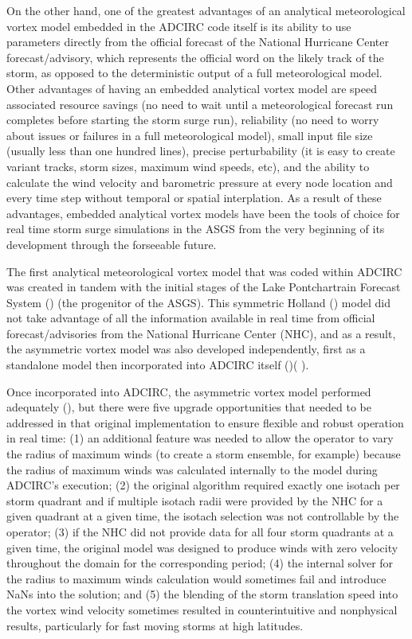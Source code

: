 \documentclass[12pt]{article}
\begin{document}
On the other hand, one of the greatest advantages of an analytical 
meteorological vortex model embedded in the ADCIRC code itself is 
its ability to use parameters directly from the official forecast of 
the National Hurricane Center forecast/advisory, which represents 
the official word on the likely track of the storm, as opposed to 
the deterministic output of a full meteorological model. Other 
advantages of having an embedded analytical vortex model are speed 
associated resource savings (no need to wait until a meteorological 
forecast run completes before starting the storm surge run), 
reliability (no need to worry about issues or failures in a full 
meteorological model), small input file size (usually less than one 
hundred lines), precise perturbability (it is easy to create variant 
tracks, storm sizes, maximum wind speeds, etc), and the ability to 
calculate the wind velocity and barometric pressure at every node 
location and every time step without temporal or spatial 
interplation. As a result of these advantages, embedded analytical 
vortex models have been the tools of choice for real time storm 
surge simulations in the ASGS from the very beginning of its 
development through the forseeable future.  

The first analytical meteorological vortex model that was coded 
within ADCIRC was created in tandem with the initial stages of the 
Lake Pontchartrain Forecast System (\cite{FlemingJG2008}) (the 
progenitor of the ASGS). This symmetric Holland (\cite 
{HollandGJ1980}) model did not take advantage of all the information 
available in real time from official forecast/advisories from the 
National Hurricane Center (NHC), and as a result, the asymmetric 
vortex model was also developed independently, first as a standalone 
model then incorporated into ADCIRC itself (\cite{MattocksC2006})(
\cite{MattocksC2008}). 

Once incorporated into ADCIRC, the asymmetric vortex model performed 
adequately (\cite{ForbesC2010}), but there were five upgrade 
opportunities that needed to be addressed in that original 
implementation to ensure flexible and robust operation in real time: 
(1) an additional feature was needed to allow the operator to vary 
the radius of maximum winds (to create a storm ensemble, for 
example) because the radius of maximum winds was calculated 
internally to the model during ADCIRC's execution; (2) the original 
algorithm required exactly one isotach per storm quadrant and if 
multiple isotach radii were provided by the NHC for a given quadrant 
at a given time, the isotach selection was not controllable by the 
operator; (3) if the NHC did not provide data for all four storm 
quadrants at a given time, the original model was designed to 
produce winds with zero velocity throughout the domain for the 
corresponding period; (4) the internal solver for the radius to 
maximum winds calculation would sometimes fail and introduce NaNs 
into the solution; and (5) the blending of the storm translation 
speed into the vortex wind velocity sometimes resulted in 
counterintuitive and nonphysical results, particularly for fast 
moving storms at high latitudes.
\end{document}
